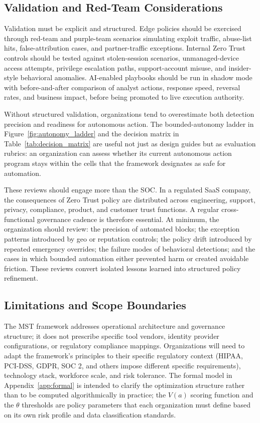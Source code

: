 \documentclass[unnumsec,webpdf,contemporary,large]{oup-authoring-template}
\theoremstyle{thmstyleone}
\theoremstyle{thmstyletwo}
\theoremstyle{thmstylethree}
\begin{document}
\subsection{Validation and Red-Team Considerations}

Validation must be explicit and structured. Edge policies should be exercised through
red-team and purple-team scenarios simulating exploit traffic, abuse-list hits,
false-attribution cases, and partner-traffic exceptions. Internal Zero Trust controls
should be tested against stolen-session scenarios, unmanaged-device access attempts,
privilege escalation paths, support-account misuse, and insider-style behavioral anomalies.
AI-enabled playbooks should be run in shadow mode with before-and-after comparison of
analyst actions, response speed, reversal rates, and business impact, before being
promoted to live execution authority.

Without structured validation, organizations tend to overestimate both detection precision
and readiness for autonomous action. The bounded-autonomy ladder in Figure~\ref{fig:autonomy_ladder}
and the decision matrix in Table~\ref{tab:decision_matrix} are useful not just as design
guides but as evaluation rubrics: an organization can assess whether its current autonomous
action program stays within the cells that the framework designates as safe for automation.

These reviews should engage more than the SOC. In a regulated SaaS company, the consequences
of Zero Trust policy are distributed across engineering, support, privacy, compliance,
product, and customer trust functions. A regular cross-functional governance cadence is
therefore essential. At minimum, the organization should review: the precision of automated
blocks; the exception patterns introduced by geo or reputation controls; the policy drift
introduced by repeated emergency overrides; the failure modes of behavioral detections; and
the cases in which bounded automation either prevented harm or created avoidable friction.
These reviews convert isolated lessons learned into structured policy refinement.

\subsection{Limitations and Scope Boundaries}

The MST framework addresses operational architecture and governance structure; it does not
prescribe specific tool vendors, identity provider configurations, or regulatory compliance
mappings. Organizations will need to adapt the framework's principles to their specific
regulatory context (HIPAA, PCI-DSS, GDPR, SOC 2, and others impose different specific
requirements), technology stack, workforce scale, and risk tolerance. The formal model in
Appendix~\ref{app:formal} is intended to clarify the optimization structure rather than to be computed
algorithmically in practice; the $V(a)$ scoring function and the $\theta$ thresholds are
policy parameters that each organization must define based on its own risk profile and
data classification standards.
\end{document}
